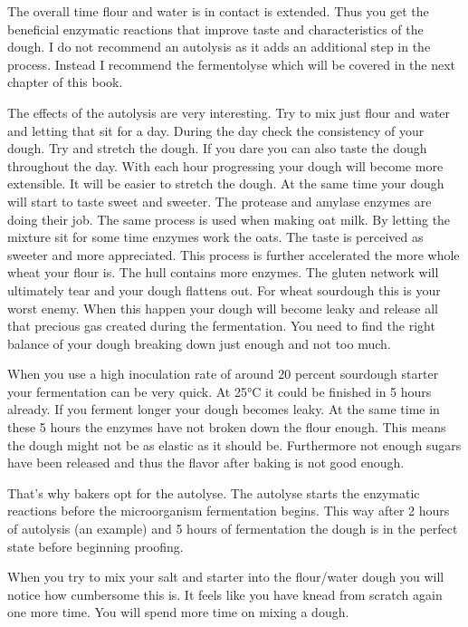 The overall time flour and water is in contact is extended. Thus you get the
beneficial enzymatic reactions that improve taste and characteristics of the
dough. I do not recommend an autolysis as it adds an additional step in the
process. Instead I recommend the fermentolyse which will be covered in the
next chapter of this book.

The effects of the autolysis are very interesting. Try to mix just flour and
water and letting that sit for a day. During the day check the consistency of
your dough. Try and stretch the dough. If you dare you can also taste the
dough throughout the day. With each hour progressing your dough will become
more extensible. It will be easier to stretch the dough. At the same time your
dough will start to taste sweet and sweeter. The protease and amylase enzymes
are doing their job. The same process is used when making oat milk. By letting
the mixture sit for some time enzymes work the oats. The taste is perceived as
sweeter and more appreciated. This process is further accelerated the more
whole wheat your flour is. The hull contains more enzymes. The gluten network
will ultimately tear and your dough flattens out. For wheat sourdough this is
your worst enemy. When this happen your dough will become leaky and release
all that precious gas created during the fermentation. You need to find the
right balance of your dough breaking down just enough and not too much.

When you use a high inoculation rate of around 20 percent sourdough starter
your fermentation can be very quick. At 25°C it could be finished in 5 hours
already. If you ferment longer your dough becomes leaky. At the same time in
these 5 hours the enzymes have not broken down the flour enough. This means
the dough might not be as elastic as it should be. Furthermore not enough
sugars have been released and thus the flavor after baking is not good enough.

That's why bakers opt for the autolyse. The autolyse starts the enzymatic
reactions before the microorganism fermentation begins. This way after 2 hours
of autolysis (an example) and 5 hours of fermentation the dough is in the
perfect state before beginning proofing.

When you try to mix your salt and starter into the flour/water dough you will
notice how cumbersome this is. It feels like you have knead from scratch again
one more time. You will spend more time on mixing a dough.

